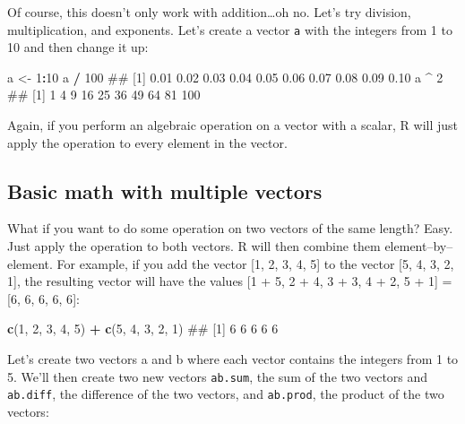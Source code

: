 \documentclass[]{book}
\newenvironment{Shaded}{\begin{snugshade}}{\end{snugshade}}
\newcommand{\KeywordTok}[1]{\textcolor[rgb]{0.13,0.29,0.53}{\textbf{#1}}}
\newcommand{\DecValTok}[1]{\textcolor[rgb]{0.00,0.00,0.81}{#1}}
\newcommand{\StringTok}[1]{\textcolor[rgb]{0.31,0.60,0.02}{#1}}
\newcommand{\OperatorTok}[1]{\textcolor[rgb]{0.81,0.36,0.00}{\textbf{#1}}}
\newcommand{\NormalTok}[1]{#1}
\theoremstyle{definition}
\theoremstyle{definition}
\theoremstyle{remark}
\begin{document}
Of course, this doesn't only work with addition\ldots{}oh no. Let's try
division, multiplication, and exponents. Let's create a vector
\texttt{a} with the integers from 1 to 10 and then change it up:

\begin{Shaded}
\begin{Highlighting}[]
\NormalTok{a <-}\StringTok{ }\DecValTok{1}\OperatorTok{:}\DecValTok{10}
\NormalTok{a }\OperatorTok{/}\StringTok{ }\DecValTok{100}
\NormalTok{##  [1] 0.01 0.02 0.03 0.04 0.05 0.06 0.07 0.08 0.09 0.10}
\NormalTok{a }\OperatorTok{^}\StringTok{ }\DecValTok{2}
\NormalTok{##  [1]   1   4   9  16  25  36  49  64  81 100}
\end{Highlighting}
\end{Shaded}

Again, if you perform an algebraic operation on a vector with a scalar,
R will just apply the operation to every element in the vector.

\subsection{Basic math with multiple
vectors}\label{basic-math-with-multiple-vectors}

What if you want to do some operation on two vectors of the same length?
Easy. Just apply the operation to both vectors. R will then combine them
element--by--element. For example, if you add the vector {[}1, 2, 3, 4,
5{]} to the vector {[}5, 4, 3, 2, 1{]}, the resulting vector will have
the values {[}1 + 5, 2 + 4, 3 + 3, 4 + 2, 5 + 1{]} = {[}6, 6, 6, 6,
6{]}:

\begin{Shaded}
\begin{Highlighting}[]
\KeywordTok{c}\NormalTok{(}\DecValTok{1}\NormalTok{, }\DecValTok{2}\NormalTok{, }\DecValTok{3}\NormalTok{, }\DecValTok{4}\NormalTok{, }\DecValTok{5}\NormalTok{) }\OperatorTok{+}\StringTok{ }\KeywordTok{c}\NormalTok{(}\DecValTok{5}\NormalTok{, }\DecValTok{4}\NormalTok{, }\DecValTok{3}\NormalTok{, }\DecValTok{2}\NormalTok{, }\DecValTok{1}\NormalTok{)}
\NormalTok{## [1] 6 6 6 6 6}
\end{Highlighting}
\end{Shaded}

Let's create two vectors a and b where each vector contains the integers
from 1 to 5. We'll then create two new vectors \texttt{ab.sum}, the sum
of the two vectors and \texttt{ab.diff}, the difference of the two
vectors, and \texttt{ab.prod}, the product of the two vectors:
\end{document}

